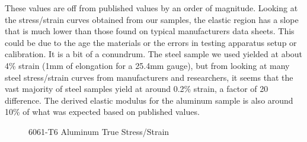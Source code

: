 \documentclass{article}
\begin{document}
These values are off from published values by an order of magnitude. Looking at the stress/strain curves obtained from our samples, the elastic region has a slope that is much lower than those found on typical manufacturers data sheets. This could be due to the age the materials or the errors in testing apparatus setup or calibration. It is a bit of a conundrum. The steel sample we used yielded at about 4\% strain (1mm of elongation for a 25.4mm gauge), but from looking at many steel stress/strain curves from manufacturers and researchers, it seems that the vast majority of steel samples yield at around 0.2\% strain, a factor of 20 difference. The derived elastic modulus for the aluminum sample is also around 10\% of what was expected based on published values.

\begin{figure}[H]
\begin{center}
	\caption{6061-T6 Aluminum True Stress/Strain}
	\label{tab:graph4}
\end{center}
\end{figure}
\end{document}

